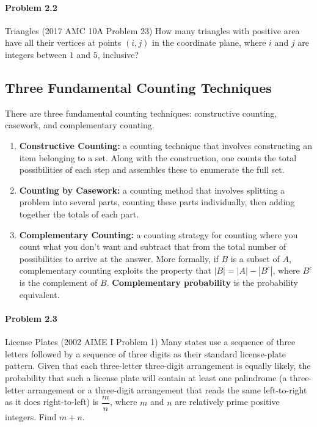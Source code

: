 \documentclass{article}
\begin{document}
\paragraph{Problem 2.2} Triangles (2017 AMC 10A Problem 23)
\newline\newline
How many triangles with positive area have all their vertices at points $(i,j)$ in the coordinate plane, where $i$ and $j$ are integers between $1$ and $5$, inclusive?
\newline
\newline
\subsection{Three Fundamental Counting Techniques}
\newline
There are three fundamental counting techniques: constructive counting, casework, and complementary counting.
\newline \begin{enumerate}

\item{\textbf{Constructive Counting:} a counting technique that involves constructing an item belonging to a set. Along with the construction, one counts the total possibilities of each step and assembles these to enumerate the full set.}

\item{\textbf{Counting by Casework:} a counting method that involves splitting a problem into several parts, counting these parts individually, then adding together the totals of each part.}

\item{\textbf{Complementary Counting:} a counting strategy for counting where you count what you don't want and subtract that from the total number of possibilities to arrive at the answer. More formally, if $B$ is a subset of $A$, complementary counting exploits the property that $|B| = |A| - |B^c|$, where $B^c$ is the complement of $B$. \textbf{Complementary probability} is the probability equivalent.}

\end{enumerate}
\newline
\newline
\paragraph{Problem 2.3} License Plates (2002 AIME I Problem 1)
\newline
\newline
Many states use a sequence of three letters followed by a sequence of three digits as their standard license-plate pattern. Given that each three-letter three-digit arrangement is equally likely, the probability that such a license plate will contain at least one palindrome (a three-letter arrangement or a three-digit arrangement that reads the same left-to-right as it does right-to-left) is $\dfrac{m}{n}$, where $m$ and $n$ are relatively prime positive integers. Find $m+n.$
\newline
\newline
\newline
\end{document}

